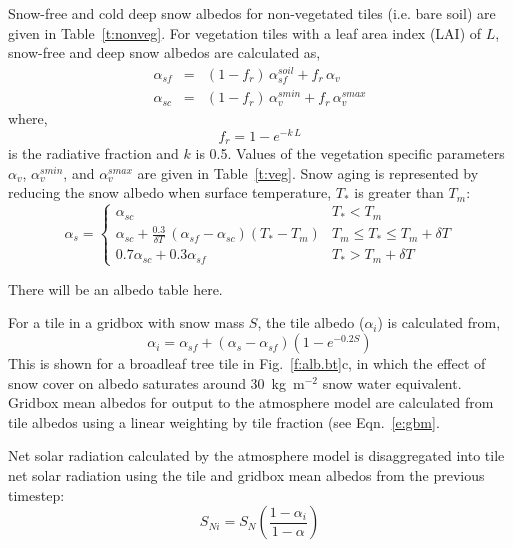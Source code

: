 \documentclass[a4paper]{article}
\begin{document}
Snow-free and cold deep snow albedos for non-vegetated tiles
(i.e. bare soil) are given in Table~\ref{t:nonveg}.  For vegetation
tiles with a leaf area index (LAI) of $L$, snow-free and deep snow
albedos are calculated as,
\begin{eqnarray}
  \alpha_{sf} &=& (1 - f_r)\, \alpha_{sf}^{soil} + f_r \, \alpha_v
  \label{e:a0} \\
  \alpha_{sc} &=& (1 - f_r) \, \alpha_v^{smin} + f_r \, \alpha_v^{smax} \label{e:acds}
\end{eqnarray}
where,
\begin{equation}
  f_r = 1- e^{-k\, L} \label{e:fr}
\end{equation}
is the radiative fraction and $k$ is 0.5.  Values of the vegetation
specific parameters $\alpha_v$, $\alpha_v^{smin}$, and
$\alpha_v^{smax}$ are given in Table~\ref{t:veg}.  Snow aging is
represented by reducing the snow albedo when surface temperature,
$T_*$ is greater than $T_m$:
\begin{equation}
  \alpha_s = \left\{
          \begin{array}{lc} 
               \alpha_{sc} & T_* < T_m \\
               \alpha_{sc} + \frac{0.3}{\delta T} \, (\alpha_{sf} -
               \alpha_{sc})(T_* - T_m) & T_m \leq T_* \leq T_m +
               \delta T \\
                0.7\alpha_{sc} + 0.3\alpha_{sf} & T_* > T_m + \delta T
          \end{array}\right. \label{e:als}
\end{equation}
\begin{table}
\caption{There will be an albedo table here.}\label{t:veg}
\end{table}
For a tile in a gridbox with snow mass $S$, the tile albedo
($\alpha_i$) is calculated from,
\begin{equation}
  \alpha_i = \alpha_{sf} + (\alpha_s-\alpha_{sf})\left( 1-e^{-0.2S}\right) \label{e:al}
\end{equation}
This is shown for a broadleaf tree tile in Fig.~\ref{f:alb.bt}c, in
which the effect of snow cover on albedo saturates around
30~kg~m$^{-2}$ snow water equivalent.  Gridbox mean albedos for output
to the atmosphere model are calculated from tile albedos using a
linear weighting by tile fraction (see Eqn.~\eqref{e:gbm}.

Net solar radiation calculated by the atmosphere model is
disaggregated into tile net solar radiation using the tile
and gridbox mean albedos from the previous timestep:
\begin{equation}
  S_{Ni} = S_N \left(\frac{1-\alpha_i}{1-\alpha}\right) \label{e:sn}
\end{equation}
\end{document}
